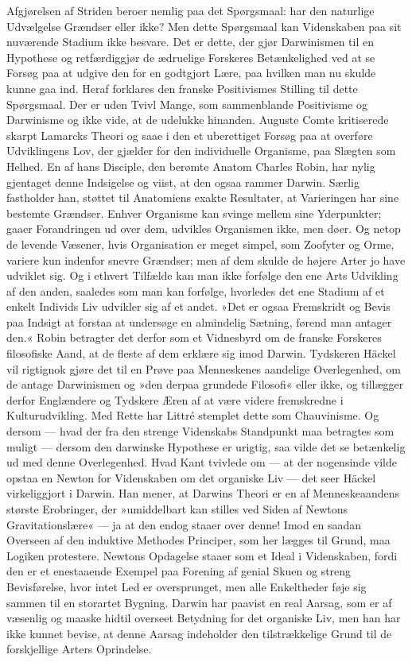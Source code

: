 \documentclass[12pt,a4paper]{article}
\begin{document}
Afgjørelsen af Striden beroer nemlig paa det Spørgsmaal: har den
naturlige Udvælgelse Grændser eller ikke? Men dette Spørgsmaal kan
Videnskaben paa sit nuværende Stadium ikke besvare. Det er dette, der
gjør Darwinismen til en Hypothese og retfærdiggjør de ædruelige Forskeres
Betænkelighed ved at se Forsøg paa at udgive den for en godtgjort Lære,
paa hvilken man nu skulde kunne gaa ind. Heraf forklares den franske
Positivismes Stilling til dette Spørgsmaal. Der er uden Tvivl Mange, som
sammenblande Positivisme og Darwinisme og ikke vide, at de udelukke
hinanden. Auguste Comte kritiserede skarpt Lamarcks Theori og saae i den
et uberettiget Forsøg paa at overføre Udviklingens Lov, der gjælder for
den individuelle Organisme, paa Slægten som Helhed. En af hans Disciple,
den berømte Anatom Charles Robin, har nylig gjentaget denne Indsigelse og
viist, at den ogsaa rammer Darwin. Særlig fastholder han, støttet til
Anatomiens exakte Resultater, at Varieringen har sine bestemte Grændser.
Enhver Organisme kan svinge mellem sine Yderpunkter; gaaer Forandringen
ud over dem, udvikles Organismen ikke, men døer. Og netop de levende
Væsener, hvis Organisation er meget simpel, som Zoofyter og Orme, variere
kun indenfor snevre Grændser; men af dem skulde de højere Arter jo have
udviklet sig. Og i ethvert Tilfælde kan man ikke forfølge den ene Arts
Udvikling af den anden, saaledes som man kan forfølge, hvorledes det ene
Stadium af et enkelt Individs Liv udvikler sig af et andet. »Det er
ogsaa Fremskridt og Bevis paa Indsigt at forstaa at undersøge en
almindelig Sætning, førend man antager den.« Robin betragter det derfor
som et Vidnesbyrd om de franske Forskeres filosofiske Aand, at de fleste
af dem erklære sig imod Darwin. Tydskeren Häckel vil rigtignok gjøre det
til en Prøve paa Menneskenes aandelige Overlegenhed, om de antage
Darwinismen og »den derpaa grundede Filosofi« eller ikke, og tillægger
derfor Englændere og Tydskere Æren af at være videre fremskredne i
Kulturudvikling. Med Rette har Littré stemplet dette som Chauvinisme.
Og dersom --- hvad der fra den strenge Videnskabs Standpunkt maa
betragtes som muligt --- dersom den darwinske Hypothese er urigtig, saa
vilde det se betænkelig ud med denne Overlegenhed. Hvad Kant tvivlede
om --- at der nogensinde vilde opstaa en Newton for Videnskaben om det
organiske Liv --- det seer Häckel virkeliggjort i Darwin. Han mener, at
Darwins Theori er en af Menneskeaandens største Erobringer, der
»umiddelbart kan stilles ved Siden af Newtons Gravitationslære« --- ja
at den endog staaer over denne! Imod en saadan Overseen af den induktive
Methodes Principer, som her lægges til Grund, maa Logiken protestere.
Newtons Opdagelse staaer som et Ideal i Videnskaben, fordi den er et
enestaaende Exempel paa Forening af genial Skuen og streng Bevisførelse,
hvor intet Led er oversprunget, men alle Enkeltheder føje sig sammen til
en storartet Bygning. Darwin har paavist en real Aarsag, som er af
væsenlig og maaske hidtil overseet Betydning for det organiske Liv, men
han har ikke kunnet bevise, at denne Aarsag indeholder den tilstrækkelige
Grund til de forskjellige Arters Oprindelse.
\end{document}
